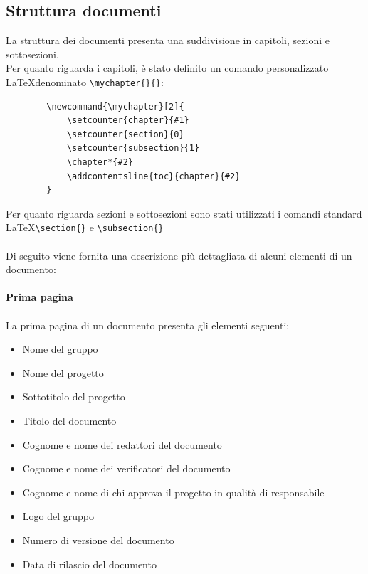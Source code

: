 \documentclass[a4paper]{report}
\newcommand{\mychapter}[2]{
	\setcounter{chapter}{#1}
	\setcounter{section}{0}
	\setcounter{subsection}{1}
	\chapter*{#2}
	\addcontentsline{toc}{chapter}{#2}
}
\begin{document}
	\subsection{Struttura documenti}
	La struttura dei documenti presenta una suddivisione in capitoli, sezioni e sottosezioni. \\
	Per quanto riguarda i capitoli, è stato definito un comando personalizzato \LaTeX \space denominato
	\verb|\mychapter{}{}|:
	\begin{verbatim}
		\newcommand{\mychapter}[2]{
			\setcounter{chapter}{#1}
			\setcounter{section}{0}
			\setcounter{subsection}{1}
			\chapter*{#2}
			\addcontentsline{toc}{chapter}{#2}
		}
	\end{verbatim}
	Per quanto riguarda sezioni e sottosezioni sono stati utilizzati i comandi standard \LaTeX \verb|\section{}| e
	\verb|\subsection{}| \\ \\
	Di seguito viene fornita una descrizione più dettagliata di alcuni elementi di un documento: \\ \\
	\textbf{Prima pagina} \\ \\ 
	La prima pagina di un documento presenta gli elementi seguenti:
	\begin{itemize}
		\item Nome del gruppo
		\item Nome del progetto
		\item Sottotitolo del progetto
		\item Titolo del documento
		\item Cognome e nome dei redattori del documento
		\item Cognome e nome dei verificatori del documento
		\item Cognome e nome di chi approva il progetto in qualità di responsabile
		\item Logo del gruppo
		\item Numero di versione del documento
		\item Data di rilascio del documento
	\end{itemize}
\end{document}
